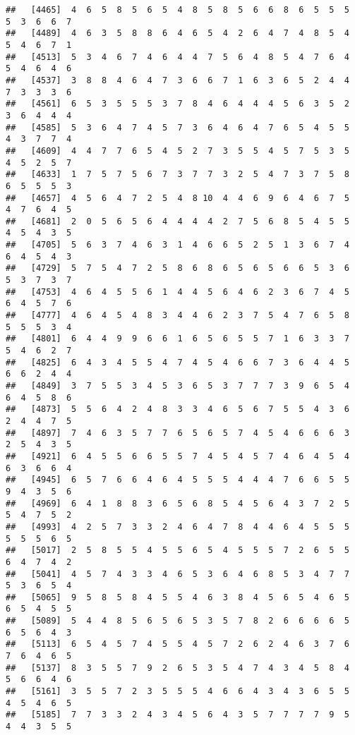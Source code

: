 \documentclass[
]{book}
\begin{document}
\begin{verbatim}
##   [4465]  4  6  5  8  5  6  5  4  8  5  8  5  6  6  8  6  5  5  5  5  3  6  6  7
##   [4489]  4  6  3  5  8  8  6  4  6  5  4  2  6  4  7  4  8  5  4  5  4  6  7  1
##   [4513]  5  3  4  6  7  4  6  4  4  7  5  6  4  8  5  4  7  6  4  5  4  6  4  6
##   [4537]  3  8  8  4  6  4  7  3  6  6  7  1  6  3  6  5  2  4  4  7  3  3  3  6
##   [4561]  6  5  3  5  5  5  3  7  8  4  6  4  4  4  5  6  3  5  2  3  6  4  4  4
##   [4585]  5  3  6  4  7  4  5  7  3  6  4  6  4  7  6  5  4  5  5  4  3  7  7  4
##   [4609]  4  4  7  7  6  5  4  5  2  7  3  5  5  4  5  7  5  3  5  4  5  2  5  7
##   [4633]  1  7  5  7  5  6  7  3  7  7  3  2  5  4  7  3  7  5  8  6  5  5  5  3
##   [4657]  4  5  6  4  7  2  5  4  8 10  4  4  6  9  6  4  6  7  5  4  7  6  4  5
##   [4681]  2  0  5  6  5  6  4  4  4  4  2  7  5  6  8  5  4  5  5  4  5  4  3  5
##   [4705]  5  6  3  7  4  6  3  1  4  6  6  5  2  5  1  3  6  7  4  6  4  5  4  3
##   [4729]  5  7  5  4  7  2  5  8  6  8  6  5  6  5  6  6  5  3  6  5  3  7  3  7
##   [4753]  4  6  4  5  5  6  1  4  4  5  6  4  6  2  3  6  7  4  5  6  4  5  7  6
##   [4777]  4  6  4  5  4  8  3  4  4  6  2  3  7  5  4  7  6  5  8  5  5  5  3  4
##   [4801]  6  4  4  9  9  6  6  1  6  5  6  5  5  7  1  6  3  3  7  5  4  6  2  7
##   [4825]  6  4  3  4  5  5  4  7  4  5  4  6  6  7  3  6  4  4  5  6  6  2  4  4
##   [4849]  3  7  5  5  3  4  5  3  6  5  3  7  7  7  3  9  6  5  4  6  4  5  8  6
##   [4873]  5  5  6  4  2  4  8  3  3  4  6  5  6  7  5  5  4  3  6  2  4  4  7  5
##   [4897]  7  4  6  3  5  7  7  6  5  6  5  7  4  5  4  6  6  6  3  2  5  4  3  5
##   [4921]  6  4  5  5  6  6  5  5  7  4  5  4  5  7  4  6  4  5  4  6  3  6  6  4
##   [4945]  6  5  7  6  6  4  6  4  5  5  5  4  4  4  7  6  6  5  5  9  4  3  5  6
##   [4969]  6  4  1  8  8  3  6  5  6  8  5  4  5  6  4  3  7  2  5  5  4  7  5  2
##   [4993]  4  2  5  7  3  3  2  4  6  4  7  8  4  4  6  4  5  5  5  5  5  5  6  5
##   [5017]  2  5  8  5  5  4  5  5  6  5  4  5  5  5  7  2  6  5  5  6  4  7  4  2
##   [5041]  4  5  7  4  3  3  4  6  5  3  6  4  6  8  5  3  4  7  7  5  3  6  5  4
##   [5065]  9  5  8  5  8  4  5  5  4  6  3  8  4  5  6  5  4  6  5  6  5  4  5  5
##   [5089]  5  4  4  8  5  6  5  6  5  3  5  7  8  2  6  6  6  6  5  6  5  6  4  3
##   [5113]  6  5  4  5  7  4  5  5  4  5  7  2  6  2  4  6  3  7  6  7  6  4  6  5
##   [5137]  8  3  5  5  7  9  2  6  5  3  5  4  7  4  3  4  5  8  4  5  6  6  4  6
##   [5161]  3  5  5  7  2  3  5  5  5  4  6  6  4  3  4  3  6  5  5  4  5  4  6  5
##   [5185]  7  7  3  3  2  4  3  4  5  6  4  3  5  7  7  7  7  9  5  4  4  3  5  5

\end{verbatim}
\end{document}
